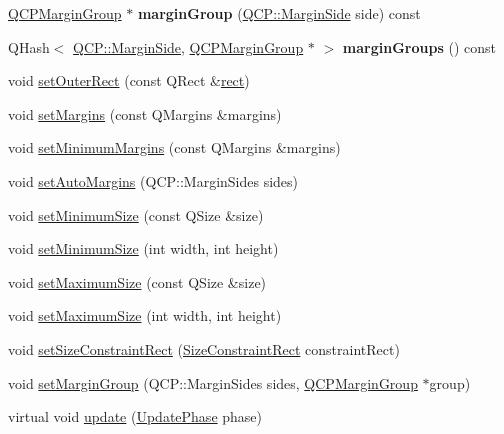 \begin{DoxyCompactItemize}
\hyperlink{classQCPMarginGroup}{Q\+C\+P\+Margin\+Group} $\ast$ {\bfseries margin\+Group} (\hyperlink{namespaceQCP_a7e487e3e2ccb62ab7771065bab7cae54}{Q\+C\+P\+::\+Margin\+Side} side) const
\item 
\mbox{\label{classQCPLayoutElement_ac8d1139a81a1625860647e307ae2b733}} 
Q\+Hash$<$ \hyperlink{namespaceQCP_a7e487e3e2ccb62ab7771065bab7cae54}{Q\+C\+P\+::\+Margin\+Side}, \hyperlink{classQCPMarginGroup}{Q\+C\+P\+Margin\+Group} $\ast$ $>$ {\bfseries margin\+Groups} () const
\item 
void \hyperlink{classQCPLayoutElement_a38975ea13e36de8e53391ce41d94bc0f}{set\+Outer\+Rect} (const Q\+Rect \&\hyperlink{classQCPLayoutElement_a208effccfe2cca4a0eaf9393e60f2dd4}{rect})
\item 
void \hyperlink{classQCPLayoutElement_a8f450b1f3f992ad576fce2c63d8b79cf}{set\+Margins} (const Q\+Margins \&margins)
\item 
void \hyperlink{classQCPLayoutElement_a0a8a17abc16b7923159fcc7608f94673}{set\+Minimum\+Margins} (const Q\+Margins \&margins)
\item 
void \hyperlink{classQCPLayoutElement_accfda49994e3e6d51ed14504abf9d27d}{set\+Auto\+Margins} (Q\+C\+P\+::\+Margin\+Sides sides)
\item 
void \hyperlink{classQCPLayoutElement_a5dd29a3c8bc88440c97c06b67be7886b}{set\+Minimum\+Size} (const Q\+Size \&size)
\item 
void \hyperlink{classQCPLayoutElement_a8e0447614a0bf92de9a7304588c6b96e}{set\+Minimum\+Size} (int width, int height)
\item 
void \hyperlink{classQCPLayoutElement_a74eb5280a737ab44833d506db65efd95}{set\+Maximum\+Size} (const Q\+Size \&size)
\item 
void \hyperlink{classQCPLayoutElement_a03e0e9c48f230217c529b0819f832d84}{set\+Maximum\+Size} (int width, int height)
\item 
void \hyperlink{classQCPLayoutElement_a361666cdcc6fbfd37344cc44be746b0f}{set\+Size\+Constraint\+Rect} (\hyperlink{classQCPLayoutElement_a0afb3e5773529e4bd20e448f81be4d2a}{Size\+Constraint\+Rect} constraint\+Rect)
\item 
void \hyperlink{classQCPLayoutElement_a516e56f76b6bc100e8e71d329866847d}{set\+Margin\+Group} (Q\+C\+P\+::\+Margin\+Sides sides, \hyperlink{classQCPMarginGroup}{Q\+C\+P\+Margin\+Group} $\ast$group)
\item 
virtual void \hyperlink{classQCPLayoutElement_a929c2ec62e0e0e1d8418eaa802e2af9b}{update} (\hyperlink{classQCPLayoutElement_a0d83360e05735735aaf6d7983c56374d}{Update\+Phase} phase)

\end{DoxyCompactItemize}
